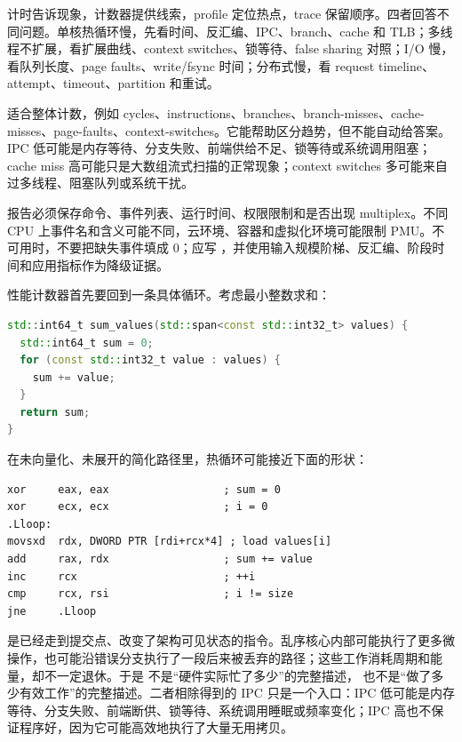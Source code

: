 计时告诉现象，计数器提供线索，profile 定位热点，trace 保留顺序。四者回答不同问题。单核热循环慢，先看时间、反汇编、IPC、branch、cache 和 TLB；多线程不扩展，看扩展曲线、context switches、锁等待、false sharing 对照；I/O 慢，看队列长度、page faults、write/fsync 时间；分布式慢，看 request timeline、attempt、timeout、partition 和重试。

 适合整体计数，例如 cycles、instructions、branches、branch-misses、cache-misses、page-faults、context-switches。它能帮助区分趋势，但不能自动给答案。IPC 低可能是内存等待、分支失败、前端供给不足、锁等待或系统调用阻塞；cache miss 高可能只是大数组流式扫描的正常现象；context switches 多可能来自过多线程、阻塞队列或系统干扰。

报告必须保存命令、事件列表、运行时间、权限限制和是否出现 multiplex。不同 CPU 上事件名和含义可能不同，云环境、容器和虚拟化环境可能限制 PMU。不可用时，不要把缺失事件填成 0；应写 ，并使用输入规模阶梯、反汇编、阶段时间和应用指标作为降级证据。

性能计数器首先要回到一条具体循环。考虑最小整数求和：

\begin{lstlisting}[language=C++,caption={整数求和的 C++ 形态}]
std::int64_t sum_values(std::span<const std::int32_t> values) {
  std::int64_t sum = 0;
  for (const std::int32_t value : values) {
    sum += value;
  }
  return sum;
}
\end{lstlisting}

在未向量化、未展开的简化路径里，热循环可能接近下面的形状：

\begin{lstlisting}[numbers=none,caption={求和循环的一种典型汇编形态}]
xor     eax, eax                  ; sum = 0
xor     ecx, ecx                  ; i = 0
.Lloop:
movsxd  rdx, DWORD PTR [rdi+rcx*4] ; load values[i]
add     rax, rdx                  ; sum += value
inc     rcx                       ; ++i
cmp     rcx, rsi                  ; i != size
jne     .Lloop
\end{lstlisting}

 是已经走到提交点、改变了架构可见状态的指令。乱序核心内部可能执行了更多微操作，也可能沿错误分支执行了一段后来被丢弃的路径；这些工作消耗周期和能量，却不一定退休。于是  不是“硬件实际忙了多少”的完整描述， 也不是“做了多少有效工作”的完整描述。二者相除得到的 IPC 只是一个入口：IPC 低可能是内存等待、分支失败、前端断供、锁等待、系统调用睡眠或频率变化；IPC 高也不保证程序好，因为它可能高效地执行了大量无用拷贝。

